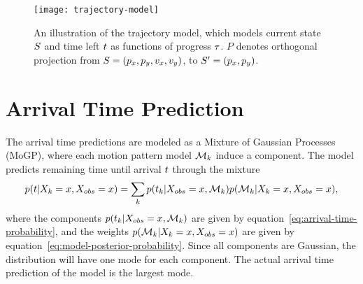 \begin{figure}
  \centering
  \texttt{[image: trajectory-model]}
  \caption{An illustration of the trajectory model, which models
    current state $S$ and time left $t$ as functions of
    progress $\tau$. $P$ denotes orthogonal projection from $S
    = (p_x, p_y, v_x, v_y)$, to $S' = (p_x, p_y)$.}\label{fig:trajectory-model}
\end{figure}

\section{Arrival Time Prediction}
The arrival time predictions are modeled as a Mixture of Gaussian
Processes (MoGP), where each motion pattern model $\mathcal{M}_{k}$ induce a component. The
model predicts remaining time until arrival $t$ through the mixture
\begin{equation}
  \label{eq:arrival-time-probability}
  p(t \vert X_{k} = x, X_{obs} = x) = 
  \sum_{k}p(t_{k} \vert X_{obs} = x, \mathcal{M}_{k})
  p(\mathcal{M}_{k} \vert X_{k} = x, X_{obs} = x),
\end{equation}
where the components $p(t_{k} \vert X_{obs} = x,
\mathcal{M}_{k})$ are given by equation~\ref{eq:arrival-time-probability},
and the weights $p(\mathcal{M}_{k} \vert X_{k} = x, X_{obs} = x)$
are given by equation~\ref{eq:model-posterior-probability}. Since all
components are Gaussian, the distribution will have one mode for each component. The
actual arrival time prediction of the model is the largest mode.



